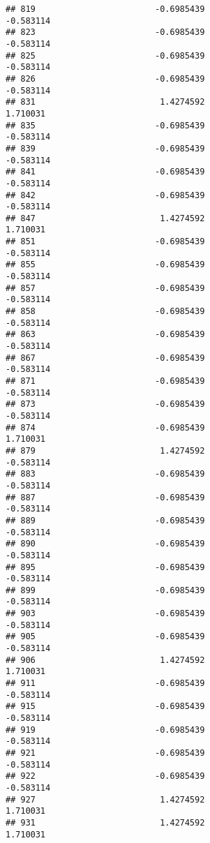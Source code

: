 \documentclass[
]{article}
\begin{document}
\begin{verbatim}
## 819                        -0.6985439                        -0.583114
## 823                        -0.6985439                        -0.583114
## 825                        -0.6985439                        -0.583114
## 826                        -0.6985439                        -0.583114
## 831                         1.4274592                         1.710031
## 835                        -0.6985439                        -0.583114
## 839                        -0.6985439                        -0.583114
## 841                        -0.6985439                        -0.583114
## 842                        -0.6985439                        -0.583114
## 847                         1.4274592                         1.710031
## 851                        -0.6985439                        -0.583114
## 855                        -0.6985439                        -0.583114
## 857                        -0.6985439                        -0.583114
## 858                        -0.6985439                        -0.583114
## 863                        -0.6985439                        -0.583114
## 867                        -0.6985439                        -0.583114
## 871                        -0.6985439                        -0.583114
## 873                        -0.6985439                        -0.583114
## 874                        -0.6985439                         1.710031
## 879                         1.4274592                        -0.583114
## 883                        -0.6985439                        -0.583114
## 887                        -0.6985439                        -0.583114
## 889                        -0.6985439                        -0.583114
## 890                        -0.6985439                        -0.583114
## 895                        -0.6985439                        -0.583114
## 899                        -0.6985439                        -0.583114
## 903                        -0.6985439                        -0.583114
## 905                        -0.6985439                        -0.583114
## 906                         1.4274592                         1.710031
## 911                        -0.6985439                        -0.583114
## 915                        -0.6985439                        -0.583114
## 919                        -0.6985439                        -0.583114
## 921                        -0.6985439                        -0.583114
## 922                        -0.6985439                        -0.583114
## 927                         1.4274592                         1.710031
## 931                         1.4274592                         1.710031

\end{verbatim}
\end{document}
